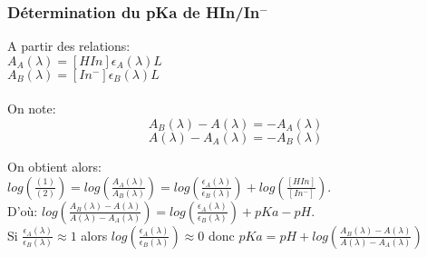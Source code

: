 \documentclass{scrartcl}
\begin{document}
			\subsubsection{Détermination du pKa de HIn/In$^-$}
			
				A partir des relations:\\
				$A_A(\lambda) = [HIn]\epsilon_A(\lambda)L$\\
				$A_B(\lambda) = [In^-]\epsilon_B(\lambda)L$\\\\
				
				On note:
				\begin{equation}
					A_B(\lambda) - A(\lambda) = -A_A(\lambda)
				\end{equation}
				\begin{equation}
					A(\lambda) - A_A(\lambda) = -A_B(\lambda)
				\end{equation}
				
				On obtient alors:\\
				$log\left(\frac{(1)}{(2)}\right) = log\left(\frac{A_A(\lambda)}{A_B(\lambda)}\right) = log\left(\frac{\epsilon_A(\lambda)}{\epsilon_B(\lambda)}\right) + log\left(\frac{[HIn]}{[In^-]}\right)$.\\
				D'où: $log\left(\frac{A_B(\lambda) - A(\lambda)}{A(\lambda) - A_A(\lambda)}\right) = log\left(\frac{\epsilon_A(\lambda)}{\epsilon_B(\lambda)}\right) + pKa - pH$.\\
				Si $\frac{\epsilon_A(\lambda)}{\epsilon_B(\lambda)} \approx 1$ alors $log\left(\frac{\epsilon_A(\lambda)}{\epsilon_B(\lambda)}\right) \approx 0$ donc $pKa = pH + log\left(\frac{A_B(\lambda) - A(\lambda)}{A(\lambda) - A_A(\lambda)}\right)$
			
\end{document}
